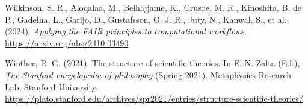 \documentclass[
  man, noextraspace,floatsintext]{apa7}
\newlength{\cslhangindent}
\newenvironment{CSLReferences}[2] %
 {\begin{list}{}{%
  \setlength{\itemindent}{0pt}
  \setlength{\leftmargin}{0pt}
  \setlength{\parsep}{0pt}
  \ifodd #1
   \setlength{\leftmargin}{\cslhangindent}
   \setlength{\itemindent}{-1\cslhangindent}
  \fi
  \setlength{\itemsep}{#2\baselineskip}}}
 {\end{list}}
\begin{document}
\begin{CSLReferences}{1}{0}
Wilkinson, S. R., Aloqalaa, M., Belhajjame, K., Crusoe, M. R., Kinoshita, B. de P., Gadelha, L., Garijo, D., Gustafsson, O. J. R., Juty, N., Kanwal, S., et al. (2024). \emph{Applying the {FAIR} principles to computational workflows}. \url{https://arxiv.org/abs/2410.03490}

Winther, R. G. (2021). The structure of scientific theories. In E. N. Zalta (Ed.), \emph{The {Stanford} encyclopedia of philosophy} (Spring 2021). Metaphysics Research Lab, Stanford University. \url{https://plato.stanford.edu/archives/spr2021/entries/structure-scientific-theories/}

\end{CSLReferences}
\end{document}
